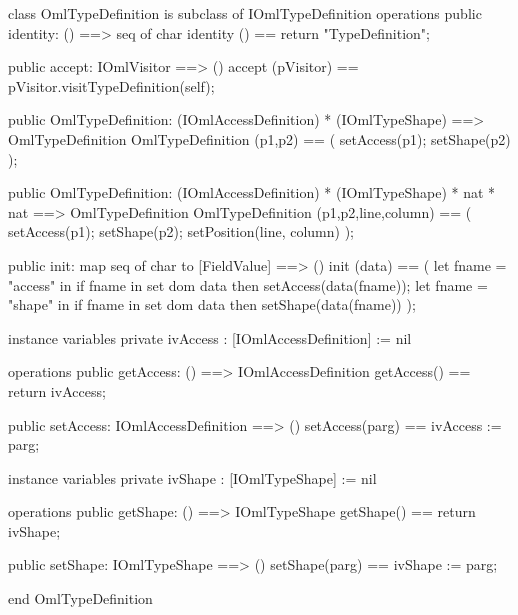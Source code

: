 \begin{vdm_al}
class OmlTypeDefinition is subclass of IOmlTypeDefinition
operations
  public identity: () ==> seq of char
  identity () == return "TypeDefinition";

  public accept: IOmlVisitor ==> ()
  accept (pVisitor) == pVisitor.visitTypeDefinition(self);

  public OmlTypeDefinition:
    (IOmlAccessDefinition) *
    (IOmlTypeShape) ==> OmlTypeDefinition
  OmlTypeDefinition (p1,p2) == 
    ( setAccess(p1);
      setShape(p2) );

  public OmlTypeDefinition:
    (IOmlAccessDefinition) *
    (IOmlTypeShape) *
    nat *
    nat ==> OmlTypeDefinition
  OmlTypeDefinition (p1,p2,line,column) == 
    ( setAccess(p1);
      setShape(p2);
      setPosition(line, column) );

  public init: map seq of char to [FieldValue] ==> ()
  init (data) ==
    ( let fname = "access" in
        if fname in set dom data
        then setAccess(data(fname));
      let fname = "shape" in
        if fname in set dom data
        then setShape(data(fname)) );

instance variables
  private ivAccess : [IOmlAccessDefinition] := nil

operations
  public getAccess: () ==> IOmlAccessDefinition
  getAccess() == return ivAccess;

  public setAccess: IOmlAccessDefinition ==> ()
  setAccess(parg) == ivAccess := parg;

instance variables
  private ivShape : [IOmlTypeShape] := nil

operations
  public getShape: () ==> IOmlTypeShape
  getShape() == return ivShape;

  public setShape: IOmlTypeShape ==> ()
  setShape(parg) == ivShape := parg;

end OmlTypeDefinition
\end{vdm_al}

